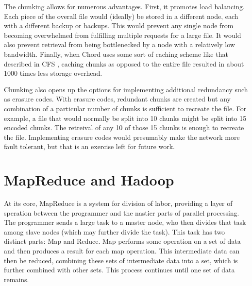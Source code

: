 \documentclass[conference, compsocconf, letterpaper]{IEEEtran}
\begin{document}
The chunking allows for numerous advantages.  First, it promotes load balancing. Each piece of the overall file would (ideally) be stored in a different node, each with a different backup or backups.  This would prevent any single node from becoming overwhelmed from fulfilling multiple requests for a large file.  It would also prevent retrieval from being bottlenecked by a node with a relatively low bandwidth. Finally, when Chord uses some sort of caching scheme like that described in CFS \cite{CFS}, caching chunks as opposed to the entire file resulted in about 1000 times less storage overhead.  


Chunking also opens up the options for implementing additional redundancy such as erasure codes\cite{rizzo1997effective}. With erasure codes, redundant chunks are created but any combination of a particular number of chunks is sufficient to recreate the file.  For example, a file that would normally be split into 10 chunks might be split into 15 encoded chunks.  The retreival of any 10 of those 15 chunks is enough to recreate the file.  Implementing erasure codes would presumably make the network more fault tolerant, but that is an exercise left for future work.





\section{MapReduce and Hadoop}
At its core, MapReduce \cite{mapreduce} is a system for division of labor, providing a layer of speration between the programmer and the nastier parts of parallel processing.  The programmer sends a large task to a master node, who then divides that task among slave nodes (which may further divide the task).  This task has two distinct parts: Map and Reduce.  Map performs some operation on a set of data and then produces a result for each map operation.  This intermediate data can then be reduced, combining these sets of intermediate data into a set, which is further combined with other sets.  This process continues until one set of data remains.
\end{document}
